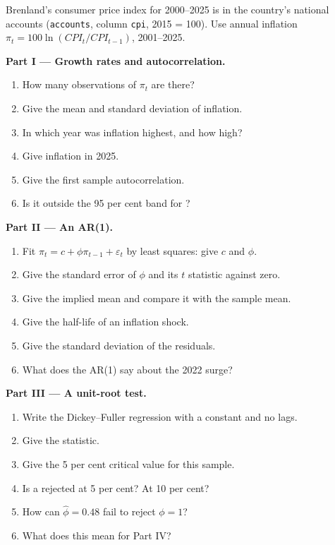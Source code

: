 \begin{problem}
\label{pb:b2:time-series:1}
Brenland's consumer price index for 2000--2025 is in the country's national accounts (\texttt{accounts}, column
\texttt{cpi}, 2015 = 100). Use annual inflation $\pi_t = 100\ln(\mathit{CPI}_t/\mathit{CPI}_{t-1})$, 2001--2025.

\medskip
\noindent\textbf{Part I --- Growth rates and autocorrelation.}
\begin{enumerate}
  \item How many observations of $\pi_t$ are there?
  \item Give the mean and standard deviation of inflation.
  \item In which year was inflation highest, and how high?
  \item Give inflation in 2025.
  \item Give the first sample autocorrelation.
  \item Is it outside the 95 per cent band for ?
\end{enumerate}

\medskip
\noindent\textbf{Part II --- An AR(1).}
\begin{enumerate}[resume]
  \item Fit $\pi_t = c + \phi\pi_{t-1} + \varepsilon_t$ by least squares: give $c$ and $\phi$.
  \item Give the standard error of $\phi$ and its $t$ statistic against zero.
  \item Give the implied mean and compare it with the sample mean.
  \item Give the half-life of an inflation shock.
  \item Give the standard deviation of the residuals.
  \item What does the AR(1) say about the 2022 surge?
\end{enumerate}

\medskip
\noindent\textbf{Part III --- A unit-root test.}
\begin{enumerate}[resume]
  \item Write the Dickey--Fuller regression with a constant and no lags.
  \item Give the statistic.
  \item Give the 5 per cent critical value for this sample.
  \item Is a  rejected at 5 per cent? At 10 per cent?
  \item How can $\hat\phi = 0.48$ fail to reject $\phi = 1$?
  \item What does this mean for Part IV?
\end{enumerate}


\end{problem}
